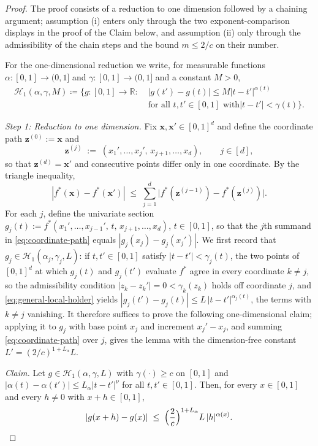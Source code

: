 \documentclass[11pt]{article}
\theoremstyle{plain}
\theoremstyle{definition}
\theoremstyle{remark}
\theoremstyle{plain}
\newcommand{\bx}{\mathbf{x}}
\newcommand{\bz}{\mathbf{z}}
\newcommand{\1}{\mathbbm{1}}
\begin{document}
\begin{proof}
The proof consists of a reduction to one dimension followed by a
chaining argument; assumption (i) enters only through the two
exponent-comparison displays in the proof of the Claim below, and
assumption (ii) only through the admissibility of the chain steps and
the bound $m\le 2/c$ on their number.

For the one-dimensional reduction we write, for measurable functions
$\alpha:[0,1]\to(0,1]$ and $\gamma:[0,1]\to(0,1]$ and a constant
$M>0$,
\begin{equation}\label{eq:1d-class}
\begin{aligned}
\mathcal{H}_1(\alpha,\gamma,M)
\coloneqq\bigl\{g:[0,1]\to\mathbb{R}:\;&
\lvert g(t')-g(t)\rvert
\le M\lvert t-t'\rvert^{\alpha(t)}\\
&\text{for all $t,t'\in[0,1]$ with
$\lvert t-t'\rvert<\gamma(t)$}\bigr\}.
\end{aligned}
\end{equation}

\medskip
\noindent\textit{Step 1: Reduction to one dimension.} Fix
$\bx,\bx'\in[0,1]^d$ and define the coordinate path
$\bz^{(0)}:=\bx$ and
\[
  \bz^{(j)} \;:=\; (x_1',\ldots,x_j',\,x_{j+1},\ldots,x_d),
  \qquad j\in[d],
\]
so that $\bz^{(d)}=\bx'$ and consecutive points differ only in one
coordinate. By the triangle inequality,
\begin{equation}\label{eq:coordinate-path}
  |f^*(\bx)-f^*(\bx')|
  \;\le\; \sum_{j=1}^d
  \bigl|f^*(\bz^{(j-1)})-f^*(\bz^{(j)})\bigr| .
\end{equation}
For each $j$, define the univariate section
$g_j(t):=f^*(x_1',\ldots,x_{j-1}',\,t,\,x_{j+1},\ldots,x_d)$,
$t\in[0,1]$, so that the $j$th summand in \eqref{eq:coordinate-path}
equals $|g_j(x_j)-g_j(x_j')|$. We first record that
$g_j\in\mathcal{H}_{1}(\alpha_j,\gamma_j,L)$: if
$t,t'\in[0,1]$ satisfy $|t-t'|<\gamma_j(t)$, the two points of
$[0,1]^d$ at which $g_j(t)$ and $g_j(t')$ evaluate $f^*$ agree in
every coordinate $k\neq j$, so the admissibility condition
$|z_k-z_k'|=0<\gamma_k(z_k)$ holds off coordinate $j$, and
\eqref{eq:general-local-holder} yields
$|g_j(t')-g_j(t)|\le L\,|t-t'|^{\alpha_j(t)}$, the terms with
$k\neq j$ vanishing. It therefore suffices to prove the following
one-dimensional claim; applying it to $g_j$ with base point $x_j$ and
increment $x_j'-x_j$, and summing \eqref{eq:coordinate-path} over $j$,
gives the lemma with the dimension-free constant
$L'=(2/c)^{1+L_\alpha}L$.

\medskip
\noindent\emph{Claim.} Let
$g\in\mathcal{H}_{1}(\alpha,\gamma,L)$ with
$\gamma(\cdot)\ge c$ on $[0,1]$ and
$\lvert\alpha(t)-\alpha(t')\rvert\le L_\alpha\lvert t-t'\rvert^{\nu}$
for all $t,t'\in[0,1]$. Then, for every $x\in[0,1]$ and every $h\neq0$
with $x+h\in[0,1]$,
\[
  \lvert g(x+h)-g(x)\rvert
  \;\le\; \Bigl(\frac{2}{c}\Bigr)^{1+L_\alpha} L\,
  \lvert h\rvert^{\alpha(x)} .
\]


\end{proof}
\end{document}
